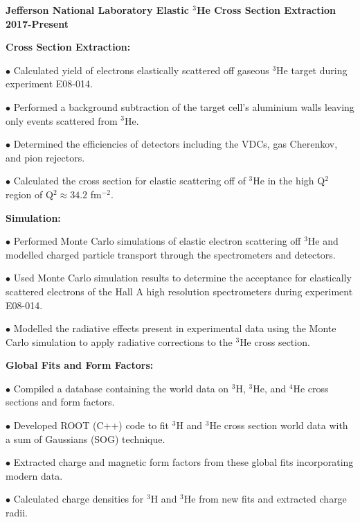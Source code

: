 \documentclass[letterpaper,10pt]{article}
\renewenvironment{itemize}{
  \begin{list}{}{
    \setlength{\leftmargin}{1.5em}
  }
}{
  \end{list}
}
\begin{document}
{\begin{itemize}
\item {\large {\bf Jefferson National Laboratory Elastic $^{3}$He Cross Section Extraction 2017-Present} }
	\begin{itemize}\itemsep5pt \parskip0pt 
		\item \textbf{Cross Section Extraction:}
			\begin{itemize}\itemsep5pt
				\item $\bullet$ Calculated yield of electrons elastically scattered off gaseous $^{3}$He target during experiment E08-014.   
				\item $\bullet$ Performed a background subtraction of the target cell's aluminium walls leaving only events scattered from $^{3}$He.
				\item $\bullet$ Determined the efficiencies of detectors including the VDCs, gas Cherenkov, and pion rejectors.
				\item $\bullet$ Calculated the cross section for elastic scattering off of $^{3}$He in the high Q$^2$ region of Q$^2 \approx 34.2$ fm$^{-2}$.
			\end{itemize}
		\item \textbf{Simulation:}
			\begin{itemize}\itemsep5pt
				\item $\bullet$ Performed Monte Carlo simulations of elastic electron scattering off $^{3}$He and modelled charged particle transport through the spectrometers and detectors. %
				\item $\bullet$ Used Monte Carlo simulation results to determine the acceptance for elastically scattered electrons of the Hall A high resolution spectrometers during experiment E08-014. 
				\item $\bullet$ Modelled the radiative effects present in experimental data using the Monte Carlo simulation to apply radiative corrections to the $^{3}$He cross section.
			\end{itemize}
		\item \textbf{Global Fits and Form Factors:}
			\begin{itemize}\itemsep5pt
				\item $\bullet$ Compiled a database containing the world data on $^{3}$H, $^{3}$He, and $^{4}$He cross sections and form factors.
				\item $\bullet$ Developed ROOT (C++) code to fit $^{3}$H and $^{3}$He cross section world data with a sum of Gaussians (SOG) technique. 
				\item $\bullet$ Extracted charge and magnetic form factors from these global fits incorporating modern data. 
				\item $\bullet$ Calculated charge densities for $^{3}$H and $^{3}$He from new fits and extracted charge radii. 
			\end{itemize}
			

\end{itemize}
\end{itemize}}
\end{document}
